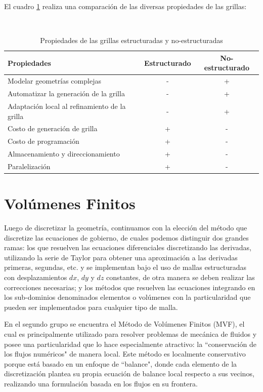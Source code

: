 \documentclass[a4paper,10pt, oneside]{book}
\begin{document}
El cuadro \ref{tabla1} realiza una comparación de las diversas propiedades de las grillas:

$ \ $ 
\begin{table}[h!]
\centering
\begin{tabular}{| l c c |}
	\hline
	Propiedades & Estructurado & No-estructurado \\
	\hline
	Modelar geometrías complejas & - & + \\
	Automatizar la generación de la grilla & - & + \\
	Adaptación local al refinamiento de la grilla & - & + \\	
	Costo de generación de grilla & + & - \\
	Costo de programación & + & - \\
	Almacenamiento y direccionamiento & + & - \\
	Paralelización & + & - \\
	\hline	
\end{tabular}
\caption{Propiedades de las grillas estructuradas y no-estructuradas}
\label{tabla1}
\end{table}
\chapter{Volúmenes Finitos}

Luego de discretizar la geometría, continuamos con la elección del método que discretize las ecuaciones de gobierno, de cuales podemos distinguir dos grandes ramas: los que resuelven las ecuaciones diferenciales discretizando las derivadas, utilizando la serie de Taylor para obtener una aproximación a las derivadas primeras, segundas, etc. y se implementan bajo el uso de mallas estructuradas con desplazamientos $dx$, $dy$ y $dz$ constantes, de otra manera se deben realizar las correcciones necesarias; y los métodos que resuelven las ecuaciones integrando en los sub-dominios denominados elementos o volúmenes con la particularidad que pueden ser implementados para cualquier tipo de malla. 

En el segundo grupo se encuentra el Método de Volúmenes Finitos (MVF), el cual es principalmente utilizado para resolver problemas de mecánica de fluidos y posee una particularidad que lo hace especialmente atractivo: la ``conservación de los flujos numéricos" de manera local. Este método es localmente conservativo porque está basado en un enfoque de ``balance", donde cada elemento de la discretización plantea su propia ecuación de balance local respecto a sus vecinos, realizando una formulación basada en los flujos en su frontera.
\end{document}
